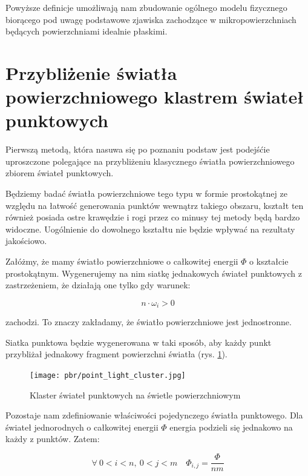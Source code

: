\documentclass[../main.tex]{subfiles}
\begin{document}
Powyższe definicje umożliwają nam zbudowanie ogólnego modelu fizycznego
biorącego pod uwagę podstawowe zjawiska zachodzące w mikropowierzchniach
będących powierzchniami idealnie płaskimi.


\section{Przybliżenie światła powierzchniowego klastrem świateł punktowych}

Pierwszą metodą, która nasuwa się po poznaniu podstaw jest podejśćie
uproszczone polegające na przybliżeniu klasycznego światła powierzchniowego
zbiorem świateł punktowych.

Będziemy badać światła powierzchniowe tego typu w formie prostokątnej ze względu
na łatwość generowania punktów wewnątrz takiego obszaru, kształt ten również
posiada ostre krawędzie i rogi przez co minusy tej metody będą bardzo widoczne.
Uogólnienie do dowolnego kształtu nie będzie wpływać na rezultaty jakościowo.

Załóżmy, że mamy światło powierzchniowe o całkowitej energii $\Phi$ o kształcie
prostokątnym. Wygenerujemy na nim siatkę jednakowych świateł punktowych z
zastrzeżeniem, że działają one tylko gdy warunek:

\[ n \cdot \omega_i > 0 \]

\noindent zachodzi. To znaczy zakładamy, że światło powierzchniowe jest
jednostronne.

Siatka punktowa będzie wygenerowana w taki sposób, aby każdy punkt przybliżał
jednakowy fragment powierzchni światła (rys. \ref{fig:PointLightCluster}).

\begin{figure}[ht]
  \centering
  \texttt{[image: pbr/point\_light\_cluster.jpg]}
  \caption{Klaster świateł punktowych na świetle powierzchniowym}
  \label{fig:PointLightCluster}
\end{figure}

Pozostaje nam zdefiniowanie właściwości pojedynczego światła punktowego.
Dla świateł jednorodnych o całkowitej energii $\Phi$ energia podzieli się
jednakowo na każdy z punktów. Zatem:

\[
  \forall\:{
    0<i<n,\:
    0<j<m
  } \quad
  \Phi_{i,j} = \frac{\Phi}{nm}
\]
\end{document}
